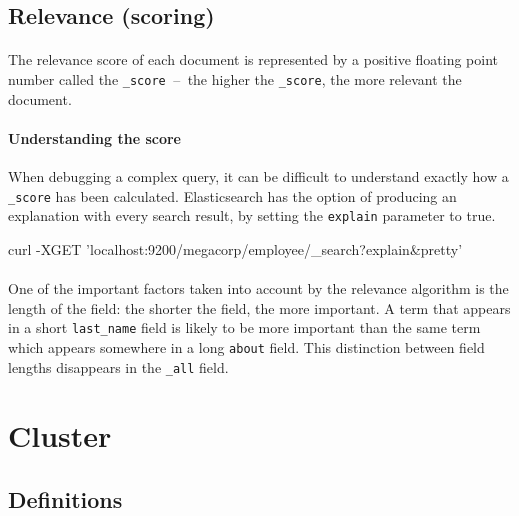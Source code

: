 \documentclass{article}%
\begin{document}
\subsection{Relevance (scoring)}

\paragraph{} The relevance score of each document is represented by a positive floating point number called the \texttt{\_score}  --  the higher the \texttt{\_score}, the more relevant the document.

\paragraph{Understanding the score} When debugging a complex query, it can be difficult to understand exactly how a \texttt{\_score} has been calculated. Elasticsearch has the option of producing an explanation with every search result, by setting the \texttt{explain} parameter to true.

\begin{command}
curl -XGET 'localhost:9200/megacorp/employee/_search?explain&pretty'
\end{command}

\paragraph{} One of the important factors taken into account by the relevance algorithm is the length of the field: the shorter the field, the more important. A term that appears in a short \texttt{last\_name} field is likely to be more important than the same term which appears somewhere in a long \texttt{about} field. This distinction between field lengths disappears in the \texttt{\_all} field.

\section{Cluster}

\subsection{Definitions}
\end{document}
